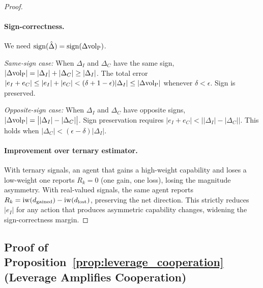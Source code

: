 \begin{proof}
\paragraph{Sign-correctness.} We need $\operatorname{sign}(\hat{\Delta}) = \operatorname{sign}(\Delta
{\operatorname{vol}_{\mathrm{P}}})$.

\emph{Same-sign case:} When $\Delta_I$ and $\Delta_C$ have the same sign,
$|\Delta {\operatorname{vol}_{\mathrm{P}}}| = |\Delta_I| + |\Delta_C| \geq |\Delta_I|$. The total error
$|e_I + e_C| \leq |e_I| + |e_C| < (\delta + 1 - \epsilon)|\Delta_I| \leq
|\Delta {\operatorname{vol}_{\mathrm{P}}}|$ whenever $\delta < \epsilon$. Sign is preserved.

\emph{Opposite-sign case:} When $\Delta_I$ and $\Delta_C$ have opposite
signs, $|\Delta {\operatorname{vol}_{\mathrm{P}}}| = \bigl||\Delta_I| - |\Delta_C|\bigr|$. Sign
preservation requires $|e_I + e_C| < \bigl||\Delta_I| - |\Delta_C|\bigr|$.
This holds when $|\Delta_C| < (\epsilon - \delta)|\Delta_I|$.

\paragraph{Improvement over ternary estimator.} With ternary signals, an
agent that gains a high-weight capability and loses a low-weight one reports
$R_k = 0$ (one gain, one loss), losing the magnitude asymmetry. With
real-valued signals, the same agent reports
$R_k = \operatorname{iw}(d_{\mathrm{gained}}) - \operatorname{iw}(d_{\mathrm{lost}})$, preserving the
net direction. This strictly reduces $|e_I|$ for any action that produces
asymmetric capability changes, widening the sign-correctness margin.
\end{proof}


\subsection{Proof of Proposition~\ref{prop:leverage_cooperation} (Leverage Amplifies Cooperation)}
\label{app:proof_leverage_cooperation}

